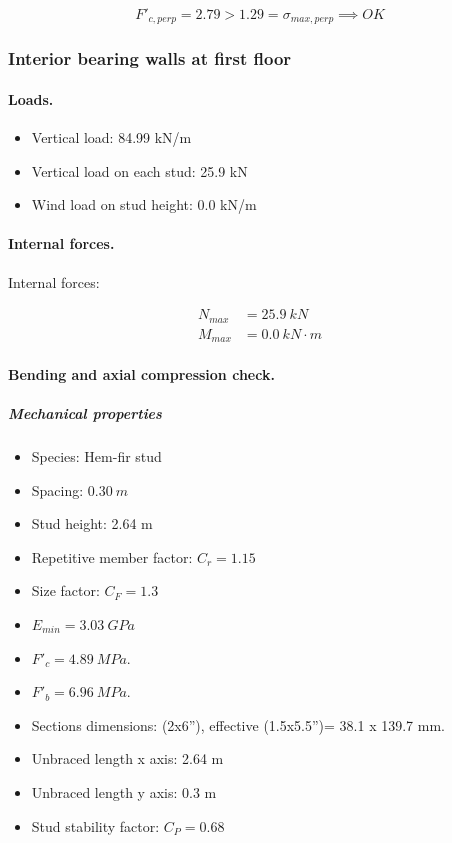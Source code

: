 \begin{equation}
F'_{c,perp} = 2.79 > 1.29 = \sigma_{max,perp} \implies OK
\end{equation}

\subsubsection{Interior bearing walls at first floor}

\paragraph{Loads.}

\begin{itemize}
\item Vertical load: 84.99 kN/m
\item Vertical load on each stud: 25.9 kN
\item Wind load on stud height: 0.0 kN/m
\end{itemize}

\paragraph{Internal forces.}

\noindent Internal forces:

\begin{align}
  N_{max}&= 25.9\ kN \\
  M_{max}&= 0.0\ kN \cdot m
\end{align}

\paragraph{Bending and axial compression check.}

\subparagraph{Mechanical properties}

\begin{itemize}
\item Species: Hem-fir stud
\item Spacing: $0.30\ m$
\item Stud height: 2.64 m
\item Repetitive member factor: $C_r= 1.15$
\item Size factor: $C_F= 1.3$
\item $E_{min}= 3.03\ GPa$
\item $F'_c= 4.89\ MPa$.
\item $F'_b= 6.96\ MPa$.
\item Sections dimensions: (2x6''), effective (1.5x5.5'')= 38.1 x 139.7  mm.
\item Unbraced length x axis: 2.64 m
\item Unbraced length y axis: 0.3 m
\item Stud stability factor: $C_P= 0.68$
\end{itemize}


